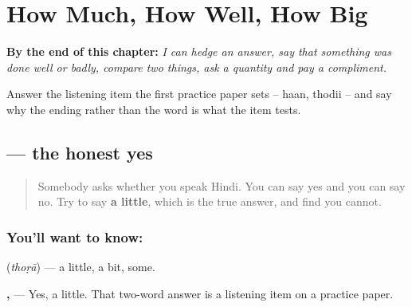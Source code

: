 
\chapter{How Much, How Well, How Big}
\label{ch:hi-maatra}

\begin{chapteropening}
\textbf{By the end of this chapter:} \emph{I can hedge an answer, say that something was done well or badly, compare two things, ask a quantity and pay a compliment.}

Answer the listening item the first practice paper sets -- haan, thodii -- and say why the ending rather than the word is what the item tests.
\end{chapteropening}

\section[\texorpdfstring{\hi{थोड़ा} (thoṛā)}{थोड़ा (thoṛā)}]{ — the honest yes}

\label{lesson:HI-C92-thoda}



\begin{quote}
Somebody asks whether you speak Hindi. You can say yes and you can say no. Try to say \textbf{a little}, which is the true answer, and find you cannot.
\end{quote}

\subsection*{You'll want to know: }
\textbf{} (\emph{thoṛā}) — a little, a bit, some.

\textbf{, } — Yes, a little. That two-word answer is a listening item on a practice paper.

